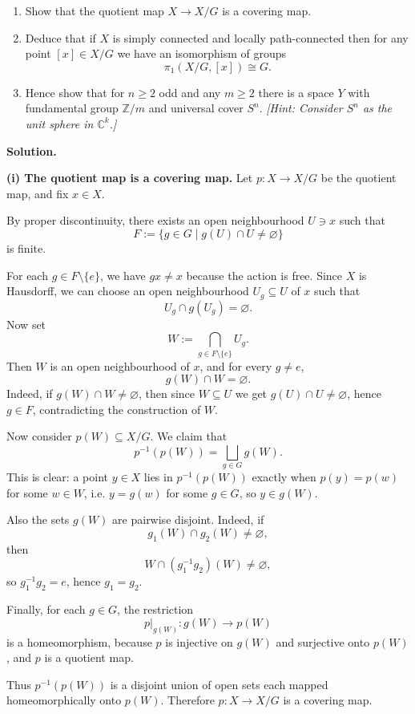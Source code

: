 \documentclass[12pt,a4paper]{article}
\theoremstyle{notespace}
\begin{document}
\begin{enumerate}
	\item[(i)] Show that the quotient map \(X\to X/G\) is a covering map.
	\item[(ii)] Deduce that if \(X\) is simply connected and locally path-connected then for any point \([x]\in X/G\) we have an isomorphism of groups
	\[
	\pi_1(X/G,[x])\cong G.
	\]
	\item[(iii)] Hence show that for \(n\ge 2\) odd and any \(m\ge 2\) there is a space \(Y\) with fundamental group \(\mathbb{Z}/m\) and universal cover \(S^n\). \emph{[Hint: Consider \(S^n\) as the unit sphere in \(\mathbb{C}^k\).]}
\end{enumerate}

\textbf{Solution.}

\textbf{(i) The quotient map is a covering map.}
Let \(p:X\to X/G\) be the quotient map, and fix \(x\in X\).

By proper discontinuity, there exists an open neighbourhood \(U\ni x\) such that
\[
F:=\{g\in G\mid g(U)\cap U\neq \varnothing\}
\]
is finite.

For each \(g\in F\setminus\{e\}\), we have \(gx\neq x\) because the action is free. Since \(X\) is Hausdorff, we can choose an open neighbourhood \(U_g\subseteq U\) of \(x\) such that
\[
U_g\cap g(U_g)=\varnothing.
\]
Now set
\[
W:=\bigcap_{g\in F\setminus\{e\}} U_g.
\]
Then \(W\) is an open neighbourhood of \(x\), and for every \(g\neq e\),
\[
g(W)\cap W=\varnothing.
\]
Indeed, if \(g(W)\cap W\neq\varnothing\), then since \(W\subseteq U\) we get \(g(U)\cap U\neq\varnothing\), hence \(g\in F\), contradicting the construction of \(W\).

Now consider \(p(W)\subseteq X/G\). We claim that
\[
p^{-1}(p(W))=\bigsqcup_{g\in G} g(W).
\]
This is clear: a point \(y\in X\) lies in \(p^{-1}(p(W))\) exactly when \(p(y)=p(w)\) for some \(w\in W\), i.e. \(y=g(w)\) for some \(g\in G\), so \(y\in g(W)\).

Also the sets \(g(W)\) are pairwise disjoint. Indeed, if
\[
g_1(W)\cap g_2(W)\neq\varnothing,
\]
then
\[
W\cap (g_1^{-1}g_2)(W)\neq\varnothing,
\]
so \(g_1^{-1}g_2=e\), hence \(g_1=g_2\).

Finally, for each \(g\in G\), the restriction
\[
p|_{g(W)}:g(W)\to p(W)
\]
is a homeomorphism, because \(p\) is injective on \(g(W)\) and surjective onto \(p(W)\), and \(p\) is a quotient map.

Thus \(p^{-1}(p(W))\) is a disjoint union of open sets each mapped homeomorphically onto \(p(W)\). Therefore \(p:X\to X/G\) is a covering map.
\end{document}
